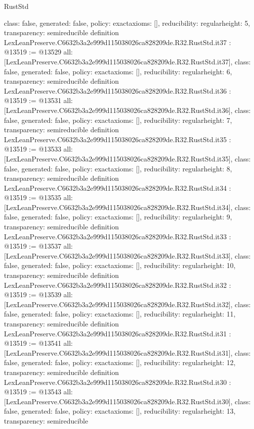 \begin{lexlean}{RustStd}
\begin{coremodule}
{  class: false,
  generated: false,
  policy: exact{axioms: []},
  reducibility: regular{height: 5},
  transparency: semireducible
}
definition LexLeanPreserve.C6632b3a2e999d115038026ca828209de.R32.RustStd.it37 : @13519 := @13529 {
  all: [LexLeanPreserve.C6632b3a2e999d115038026ca828209de.R32.RustStd.it37],
  class: false,
  generated: false,
  policy: exact{axioms: []},
  reducibility: regular{height: 6},
  transparency: semireducible
}
definition LexLeanPreserve.C6632b3a2e999d115038026ca828209de.R32.RustStd.it36 : @13519 := @13531 {
  all: [LexLeanPreserve.C6632b3a2e999d115038026ca828209de.R32.RustStd.it36],
  class: false,
  generated: false,
  policy: exact{axioms: []},
  reducibility: regular{height: 7},
  transparency: semireducible
}
definition LexLeanPreserve.C6632b3a2e999d115038026ca828209de.R32.RustStd.it35 : @13519 := @13533 {
  all: [LexLeanPreserve.C6632b3a2e999d115038026ca828209de.R32.RustStd.it35],
  class: false,
  generated: false,
  policy: exact{axioms: []},
  reducibility: regular{height: 8},
  transparency: semireducible
}
definition LexLeanPreserve.C6632b3a2e999d115038026ca828209de.R32.RustStd.it34 : @13519 := @13535 {
  all: [LexLeanPreserve.C6632b3a2e999d115038026ca828209de.R32.RustStd.it34],
  class: false,
  generated: false,
  policy: exact{axioms: []},
  reducibility: regular{height: 9},
  transparency: semireducible
}
definition LexLeanPreserve.C6632b3a2e999d115038026ca828209de.R32.RustStd.it33 : @13519 := @13537 {
  all: [LexLeanPreserve.C6632b3a2e999d115038026ca828209de.R32.RustStd.it33],
  class: false,
  generated: false,
  policy: exact{axioms: []},
  reducibility: regular{height: 10},
  transparency: semireducible
}
definition LexLeanPreserve.C6632b3a2e999d115038026ca828209de.R32.RustStd.it32 : @13519 := @13539 {
  all: [LexLeanPreserve.C6632b3a2e999d115038026ca828209de.R32.RustStd.it32],
  class: false,
  generated: false,
  policy: exact{axioms: []},
  reducibility: regular{height: 11},
  transparency: semireducible
}
definition LexLeanPreserve.C6632b3a2e999d115038026ca828209de.R32.RustStd.it31 : @13519 := @13541 {
  all: [LexLeanPreserve.C6632b3a2e999d115038026ca828209de.R32.RustStd.it31],
  class: false,
  generated: false,
  policy: exact{axioms: []},
  reducibility: regular{height: 12},
  transparency: semireducible
}
definition LexLeanPreserve.C6632b3a2e999d115038026ca828209de.R32.RustStd.it30 : @13519 := @13543 {
  all: [LexLeanPreserve.C6632b3a2e999d115038026ca828209de.R32.RustStd.it30],
  class: false,
  generated: false,
  policy: exact{axioms: []},
  reducibility: regular{height: 13},
  transparency: semireducible
}
\end{coremodule}
\end{lexlean}
